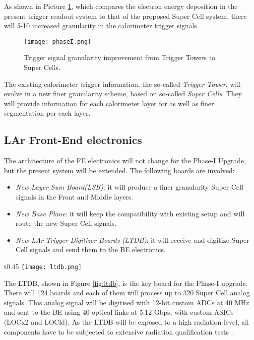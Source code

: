 \documentclass{llncs}
\begin{document}
As shown in Picture \ref{fig:PhaseI}, which compares the electron energy deposition in the present trigger readout system to that of the proposed Super Cell system, there will 5-10 increased granularity in the calorimeter trigger signals. 

\begin{figure}[h]
	\centering	
	\texttt{[image: phaseI.png]}
	\caption{Trigger signal granularity improvement from Trigger Towers to Super Cells.}
	\label{fig:PhaseI}
\end{figure}

The existing calorimeter trigger information, the so-called \emph{Trigger Tower}, will evolve in a new finer granularity scheme, based on so-called \emph{Super Cells}. They will provide information
for each calorimeter layer for as well as finer segmentation per each layer. \cite{Aleksa:1602230}

\subsection{LAr Front-End electronics}
The architecture of the FE electronics will not change for the Phase-I Upgrade, but the present system will be extended. The following boards are involved:

\begin{itemize}
\item \emph{New Layer Sum Board(LSB)}: it will produce a finer granularity Super Cell signals in the Front and Middle layers.
\item \emph{New Base Plane}: it will keep the compatibility with existing setup and will route the new Super Cell signals.
\item \emph{New LAr Trigger Digitizer Boards (LTDB)}: it will receive and digitize Super Cell signals and send them to the BE electronics.
\end{itemize}

\begin{wrapfigure}{t}{0.45\textwidth}
\vspace{-25pt}
  \centering
    \texttt{[image: ltdb.png]}
  \caption{LTDB board under test.}
  \label{fig:ltdb}
 \vspace{-20pt}
\end{wrapfigure}

The LTDB, shown in Figure \ref{fig:ltdb}, is the key board for the Phase-I upgrade. There will 124 boards and each of them will process up to 320 Super Cell analog signals. This analog signal will be digitised with 12-bit custom ADCs at 40 MHz and sent to the BE using 40 optical links at 5.12 Gbps, with custom ASICs (LOCx2 and LOCld). As the LTDB will be exposed to a high radiation level, all components have to be subjected to extensive radiation qualification tests \cite{Buchanan:1151347}.
\end{document}
